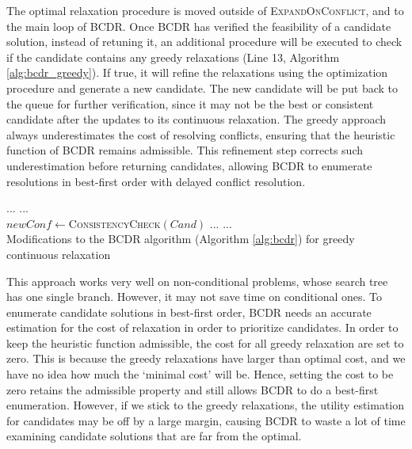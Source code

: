 \documentclass[jair,twoside,11pt,theapa]{article}
\let\oldnl\nl%
\newcommand{\nonl}{\renewcommand{\nl}{\let\nl\oldnl}}%
\begin{document}
The optimal relaxation procedure is moved outside of \textsc{ExpandOnConflict}, and to the main loop of BCDR. Once BCDR has verified
the feasibility of a candidate solution, instead of retuning it, an additional
procedure will be executed to check if the candidate contains any greedy
relaxations (Line 13, Algorithm \ref{alg:bcdr_greedy}). If true, it will refine
the relaxations using the optimization procedure and generate a new candidate.
The new candidate will be put back to the queue for further verification, since
it may not be the best or consistent candidate after the updates to its
continuous relaxation. The greedy approach always underestimates the cost of resolving conflicts, ensuring that the heuristic function of BCDR remains admissible. This refinement step corrects such underestimation before returning candidates,  allowing BCDR to enumerate resolutions in best-first order with delayed conflict resolution.



\begin{algorithm}[htb!]
\setcounter{AlgoLine}{10}
\nonl ... ...\\
$\mathit{newConf}\leftarrow$\textsc{ConsistencyCheck}$(\mathit{Cand})$\;
\nonl ... ... \\
\caption{Modifications to the BCDR algorithm (Algorithm \ref{alg:bcdr}) for greedy continuous relaxation}
\label{alg:bcdr_greedy}
\end{algorithm}



This approach works very well on non-conditional problems, whose search tree has
one single branch. However, it may not save time on conditional ones. To enumerate candidate solutions in best-first order, BCDR needs an
accurate estimation for the cost of relaxation in order to prioritize
candidates. In order to keep the heuristic function admissible, the cost for all
greedy relaxation are set to zero. This is because the greedy relaxations have larger than optimal cost, and we have no idea how much the `minimal cost'
will be. Hence, setting the cost to be zero retains the admissible property and
still allows BCDR to do a best-first enumeration. However, if we stick to the
greedy relaxations, the utility estimation for candidates may be off by a large
margin, causing BCDR to waste a lot of time examining candidate solutions that
are far from the optimal.
\end{document}
